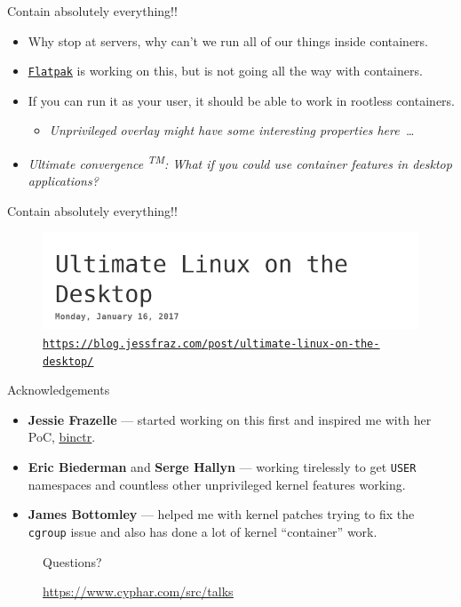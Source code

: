 \documentclass[10pt,aspectratio=169]{beamer}
\begin{document}
	\begin{frame}{Contain absolutely everything!!}
		\begin{itemize}
		    \item Why stop at servers, why can't we run all of our things inside containers.
		    \item \href{https://github.com/flatpak/flatpak}{\tt\underline{Flatpak}} is working on this, but is not going all the way with containers.
		    \item If you can run it as your user, it should be able to work in rootless containers.
		    \begin{itemize}
		        \item \textit{Unprivileged overlay might have some interesting properties here~\dots}
		    \end{itemize}   
			\item \textit{Ultimate convergence \textsuperscript{TM}: What if you could use container features in desktop applications?}
		\end{itemize}
	\end{frame}


	\begin{frame}[noframenumbering]{Contain absolutely everything!!}
	    \begin{figure}
		    \centering
    		    \includegraphics[width=\linewidth,height=0.6\textheight,keepaspectratio]{jessie_screenshot}
	        \caption{\tt\underline{\url{https://blog.jessfraz.com/post/ultimate-linux-on-the-desktop/}}}
	    \end{figure}
	\end{frame}

	\begin{frame}{Acknowledgements}
		\begin{itemize}
			\item \textbf{Jessie Frazelle} --- started working on this first and inspired me with her PoC, \href{https://github.com/jessfraz/binctr}{\underline{binctr}}.
			\item \textbf{Eric Biederman} and \textbf{Serge Hallyn} --- working tirelessly to get \texttt{USER} namespaces and countless other unprivileged kernel features working.
			\item \textbf{James Bottomley} --- helped me with kernel patches trying to fix the \texttt{cgroup} issue and also has done a lot of kernel ``container'' work.
		\end{itemize}
	\end{frame}

	\begin{frame}
		\begin{figure}
			{\Huge Questions?}
		    \caption{\small \underline{\url{https://www.cyphar.com/src/talks}}}
		\end{figure}
	\end{frame}
\end{document}
